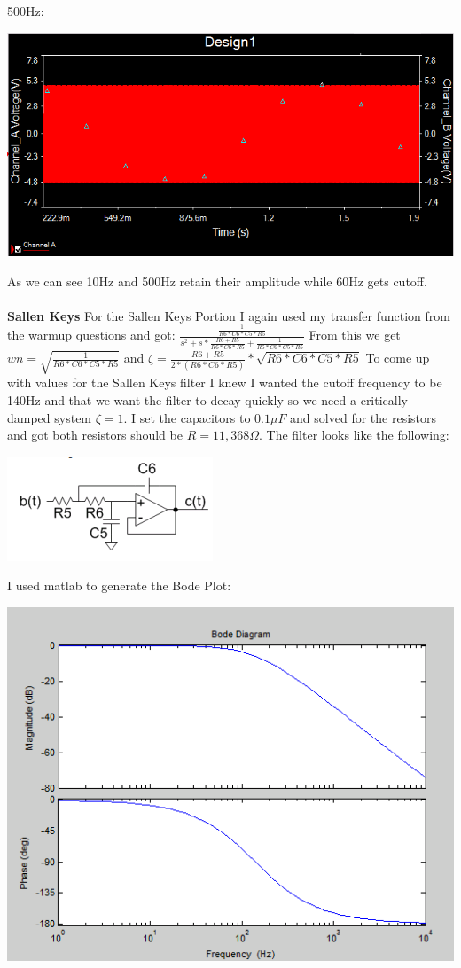 \documentclass[12pt,letterpaper,boxed]{hmcpset}
\begin{document}
500Hz:
\begin{center}
\includegraphics[scale=1]{500Hz}
\end{center}
As we can see 10Hz and 500Hz retain their amplitude while 60Hz gets cutoff.\\\\
\textbf{Sallen Keys}
For the Sallen Keys Portion I again used my transfer function from the warmup questions and got: $\frac{\frac{1}{R6*C6*C5*R5}}{s^2 + s*\frac{R6+R5}{R6*C6*R5}+\frac{1}{R6*C6*C5*R5}}$ From this we get $wn=\sqrt{\frac{1}{R6*C6*C5*R5}}$ and $\zeta = \frac{R6+R5}{2*(R6*C6*R5)}*\sqrt{R6*C6*C5*R5}$ To come up with values for the Sallen Keys filter I knew I wanted the cutoff frequency to be 140Hz and that we want the filter to decay quickly so we need a critically damped system $\zeta =1$. I set the capacitors to $0.1\mu F$ and solved for the resistors and got both resistors should be $R=11,368\Omega$. The filter looks like the following:
\begin{center}
\includegraphics[scale=1]{Sallen}
\end{center}
I used matlab to generate the Bode Plot:
\begin{center}
\includegraphics[scale=.75]{sallenKeys}
\end{center}
\end{document}
